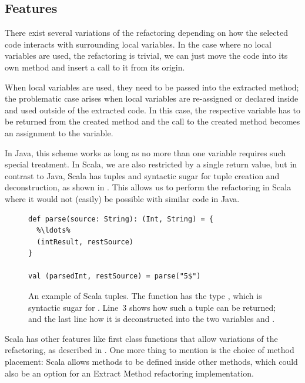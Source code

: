 \documentclass[10pt,a4paper,oneside]{scrreprt}
\begin{document}
\subsection{Features}

There exist several variations of the refactoring depending on how the selected code interacts with surrounding local variables. In the case where no local variables are used, the refactoring is trivial, we can just move the code into its own method and insert a call to it from its origin. 

When local variables are used, they need to be passed into the extracted method; the problematic case arises when local variables are re-assigned or declared inside and used outside of the extracted code. In this case, the respective variable has to be returned from the created method and the call to the created method becomes an assignment to the variable. 

In Java, this scheme works as long as no more than one variable requires such special treatment. In Scala, we are also restricted by a single return value, but in contrast to Java, Scala has tuples and syntactic sugar for tuple creation and deconstruction, as shown in . This allows us to perform the refactoring in Scala where it would not (easily) be possible with similar code in Java.

\begin{figure}
\begin{lstlisting}
def parse(source: String): (Int, String) = {
  %\ldots%
  (intResult, restSource)
}

val (parsedInt, restSource) = parse("5$")
\end{lstlisting}

\caption{An example of Scala tuples. The function  has the type , which is syntactic sugar for . Line~3 shows how such a tuple can be returned; and the last line how it is deconstructed into the two variables  and .}
\label{figure:tuple-deconstruction}
\end{figure}

Scala has other features like first class functions that allow variations of the refactoring, as described in \cite{ScalaRefactoring}. One more thing to mention is the choice of method placement: Scala allows methods to be defined inside other methods, which could also be an option for an Extract Method refactoring implementation.
\end{document}
